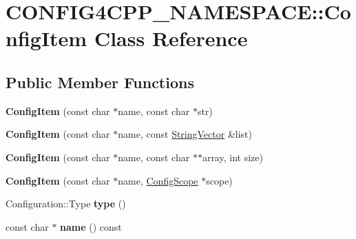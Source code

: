 \hypertarget{classCONFIG4CPP__NAMESPACE_1_1ConfigItem}{\section{C\-O\-N\-F\-I\-G4\-C\-P\-P\-\_\-\-N\-A\-M\-E\-S\-P\-A\-C\-E\-:\-:Config\-Item Class Reference}
\label{classCONFIG4CPP__NAMESPACE_1_1ConfigItem}
}
\subsection*{Public Member Functions}
\begin{DoxyCompactItemize}
\item 
\hypertarget{classCONFIG4CPP__NAMESPACE_1_1ConfigItem_af9551942ab375a3cf60df63589a45c87}{{\bfseries Config\-Item} (const char $\ast$name, const char $\ast$str)}\label{classCONFIG4CPP__NAMESPACE_1_1ConfigItem_af9551942ab375a3cf60df63589a45c87}

\item 
\hypertarget{classCONFIG4CPP__NAMESPACE_1_1ConfigItem_a688097c07bf2e67d1888c0368ecadae9}{{\bfseries Config\-Item} (const char $\ast$name, const \hyperlink{classCONFIG4CPP__NAMESPACE_1_1StringVector}{String\-Vector} \&list)}\label{classCONFIG4CPP__NAMESPACE_1_1ConfigItem_a688097c07bf2e67d1888c0368ecadae9}

\item 
\hypertarget{classCONFIG4CPP__NAMESPACE_1_1ConfigItem_a0a144e78555d2373e74a13e49006f1eb}{{\bfseries Config\-Item} (const char $\ast$name, const char $\ast$$\ast$array, int size)}\label{classCONFIG4CPP__NAMESPACE_1_1ConfigItem_a0a144e78555d2373e74a13e49006f1eb}

\item 
\hypertarget{classCONFIG4CPP__NAMESPACE_1_1ConfigItem_aaa0335d449d3cd8784e6b5f4f1754e4d}{{\bfseries Config\-Item} (const char $\ast$name, \hyperlink{classCONFIG4CPP__NAMESPACE_1_1ConfigScope}{Config\-Scope} $\ast$scope)}\label{classCONFIG4CPP__NAMESPACE_1_1ConfigItem_aaa0335d449d3cd8784e6b5f4f1754e4d}

\item 
\hypertarget{classCONFIG4CPP__NAMESPACE_1_1ConfigItem_aa4b7f08baac4a1ebb3a476f3dfd508c5}{Configuration\-::\-Type {\bfseries type} ()}\label{classCONFIG4CPP__NAMESPACE_1_1ConfigItem_aa4b7f08baac4a1ebb3a476f3dfd508c5}

\item 
\hypertarget{classCONFIG4CPP__NAMESPACE_1_1ConfigItem_a51d6a67ef249db10098450112839d73e}{const char $\ast$ {\bfseries name} () const }\label{classCONFIG4CPP__NAMESPACE_1_1ConfigItem_a51d6a67ef249db10098450112839d73e}


\end{DoxyCompactItemize}
